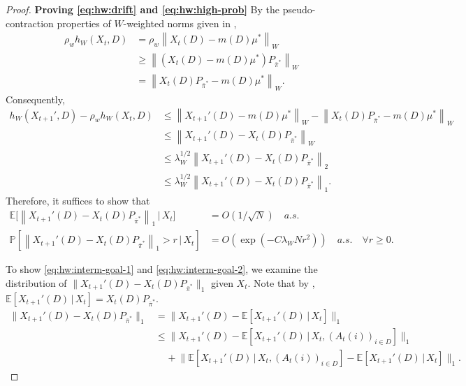 \documentclass[11pt,letterpaper]{article}
\theoremstyle{plain}
\theoremstyle{definition}
\theoremstyle{remark}
\newcommand{\norm}[1]{\left\lVert#1\right\rVert}
\newcommand{\normbig}[1]{\big\lVert#1\big\rVert}
\newcommand{\E}[1]{\mathbb{E}\left[#1\right]}
\newcommand{\Eplain}[1]{\mathbb{E}[#1]}
\newcommand{\Ebig}[1]{\mathbb{E}\big[#1\big]}
\newcommand{\givenplain}{\,|\,}
\newcommand{\givenbig}{\,\big|\,}
\newcommand{\Prob}[1]{\mathbb{P}\left[#1\right]}
\newcommand{\pibar}{{\sysbar{\pi}}}
\newcommand{\pibs}{{\pibar^*}}
\newcommand{\sysbar}[1]{\bar{#1}}
\newcommand{\statdist}{\mu^*}
\newcommand{\wmat}{W}
\newcommand{\hw}{h_\wmat}
\newcommand{\lamw}{\lambda_\wmat}
\newcommand{\rhow}{\rho_{w}}
\begin{document}
\hwhuproperties*

\begin{proof}
    \textbf{Proving \eqref{eq:hw:drift} and \eqref{eq:hw:high-prob}}
    By the pseudo-contraction properties of $\wmat$-weighted norms given in , 
    \begin{align*}
        \rhow \hw(X_t, D)  
        &=  \rhow \norm{X_{t}(D) - m(D)\statdist}_\wmat \\
        &\geq \norm{(X_{t}(D) - m(D)\statdist)P_\pibs }_\wmat \\
        & = \norm{X_{t}(D)P_\pibs - m(D)\statdist}_\wmat.
    \end{align*}
    Consequently,
    \begin{align*}
        \hw(X_{t+1}', D) - \rhow \hw(X_t, D)  
        &\leq  \norm{X_{t+1}'(D)- m(D)\statdist}_\wmat -  \norm{X_{t}(D)P_\pibs - m(D)\statdist}_\wmat \\
        &\leq  \norm{X_{t+1}'(D)- X_t(D) P_{\pibs}}_\wmat \\
        &\leq \lamw^{1/2} \norm{X_{t+1}'(D)- X_t(D) P_{\pibs}}_2 \\
        &\leq \lamw^{1/2} \norm{X_{t+1}'(D)- X_t(D) P_{\pibs}}_1.
    \end{align*}
    Therefore, it suffices to show that 
    \begin{align}
        \label{eq:hw:interm-goal-1}
        \Ebig{ \norm{X_{t+1}'(D)- X_t(D) P_{\pibs}}_1 \givenbig X_t} 
        &= O(1/\sqrt{N}) \quad a.s.  \\
        \label{eq:hw:interm-goal-2}
        \Prob{\norm{X_{t+1}'(D)- X_t(D) P_{\pibs}}_1 > r \givenbig X_t} 
        &= O(\exp(-C\lamw N r^2))   \quad a.s. \quad \forall r\geq 0.
    \end{align}
    
    
    
    To show \eqref{eq:hw:interm-goal-1} and \eqref{eq:hw:interm-goal-2}, we examine the distribution of $\normbig{X_{t+1}'(D)- X_t(D) P_{\pibs}}_1$ given $X_t$. 
    Note that by , $\Eplain{X_{t+1}'(D) \givenplain X_t} = X_t(D) P_{\pibs}$. 
    \begin{align}
        \nonumber
         \normbig{X_{t+1}'(D)- X_t(D) P_{\pibs}}_1
         &= \normbig{X_{t+1}'(D) - \E{X_{t+1}'(D) \givenplain X_t} }_1   \\
         \label{eq:hw:interm-3}
         &\leq \normbig{X_{t+1}'(D) - \E{X_{t+1}'(D) \givenplain X_t, (A_t(i))_{i\in D}} }_1 \\
         \label{eq:hw:interm-4}
         &\mspace{20mu}  +  \normbig{ \E{X_{t+1}'(D) \givenplain X_t, (A_t(i))_{i\in D}} - \E{X_{t+1}'(D) \givenplain X_t} }_1.
    \end{align}
    

\end{proof}
\end{document}
